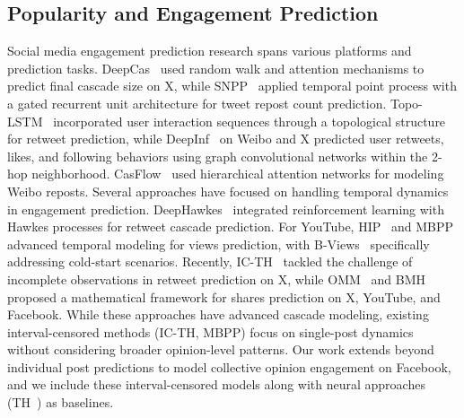\subsection{Popularity and Engagement Prediction}
Social media engagement prediction research spans various platforms and prediction tasks. 
DeepCas~\citep{li2017deepcas} used random walk and attention mechanisms to predict final cascade size on X, while SNPP~\citep{ding2019social} applied temporal point process with a gated recurrent unit architecture for tweet repost count prediction.
Topo-LSTM~\citep{wang2017topological} incorporated user interaction sequences through a topological structure for retweet prediction, while DeepInf~\citep{qiu2018deepinf} on Weibo and X predicted user retweets, likes, and following behaviors using graph convolutional networks within the 2-hop neighborhood. 
CasFlow~\citep{xu2021casflow} used hierarchical attention networks for modeling Weibo reposts.
Several approaches have focused on handling temporal dynamics in engagement prediction. DeepHawkes~\citep{cao2017deephawkes} integrated reinforcement learning with Hawkes processes for retweet cascade prediction.
For YouTube, HIP~\citep{rizoiu2017expecting} and MBPP~\citep{rizoiu2022interval,Calderon2025} advanced temporal modeling for views prediction, with B-Views~\citep{wu2018beyond} specifically addressing cold-start scenarios.
Recently, IC-TH~\citep{kong2023interval} tackled the challenge of incomplete observations in retweet prediction on X, while OMM~\citep{calderon2024opinion} and BMH~\cite{Calderon2024b} proposed a mathematical framework for shares prediction on X, YouTube, and Facebook.
While these approaches have advanced cascade modeling, existing interval-censored methods (IC-TH, MBPP) focus on single-post dynamics without considering broader opinion-level patterns. Our work extends beyond individual post predictions to model collective opinion engagement on Facebook, and we include these interval-censored models along with neural approaches (TH~\cite{zuo2020transformer}) as baselines.

